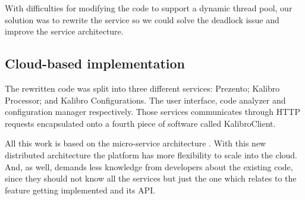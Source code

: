With difficulties for modifying the code to support a dynamic thread pool, our solution was to rewrite the service so we could solve the deadlock issue and improve the service architecture.

\subsection{Cloud-based implementation}
\label{subsec:cloud-based-implementation}

The rewritten code was split into three different services: Prezento; Kalibro Processor; and Kalibro Configurations. The user interface, code analyzer and configuration manager respectively. Those services communicates through HTTP requests encapsulated onto a fourth piece of software called KalibroClient.

All this work is based on the micro-service architecture \cite{namiot2014micro}. With this new distributed architecture the platform has more flexibility to scale into the cloud. And, as well, demands less knowledge from developers about the existing code, since they should not know all the services but just the one which relates to the feature getting implemented and its API.
